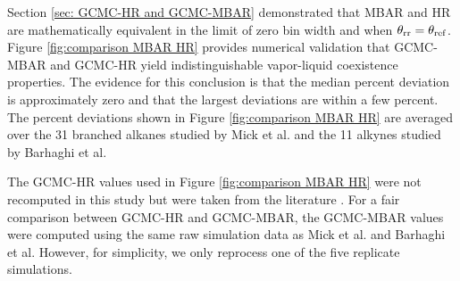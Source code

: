 \documentclass[journal=jced,manuscript=article]{achemso}
\begin{document}
Section \ref{sec: GCMC-HR and GCMC-MBAR} demonstrated that MBAR and HR are mathematically equivalent in the limit of zero bin width and when $\theta_{\rm rr} = \theta_{\rm ref}$. Figure \ref{fig:comparison MBAR HR} provides numerical validation that GCMC-MBAR and GCMC-HR yield indistinguishable vapor-liquid coexistence properties. The evidence for this conclusion is that the median percent deviation is approximately zero and that the largest deviations are within a few percent. The percent deviations shown in Figure \ref{fig:comparison MBAR HR} are averaged over the 31 branched alkanes studied by Mick et al. and the 11 alkynes studied by Barhaghi et al. 

The GCMC-HR values used in Figure \ref{fig:comparison MBAR HR} were not recomputed in this study but were taken from the literature \cite{Potoff_branched,Barhaghi2017}. For a fair comparison between GCMC-HR and GCMC-MBAR, the GCMC-MBAR values were computed using the same raw simulation data as Mick et al. and Barhaghi et al. However, for simplicity, we only reprocess one of the five replicate simulations. 


\end{document}
